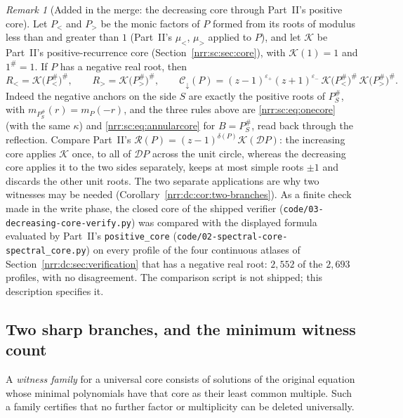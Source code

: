 \documentclass[11pt,letterpaper]{article}
\theoremstyle{definition}
\theoremstyle{remark}
\newtheorem{remark}[theorem]{Remark}
\newcommand{\scD}{\mathcal D}
\newcommand{\core}{\mathcal R}
\newcommand{\pcore}{\mathcal K}
\newcommand{\dcore}{\mathcal C_{\downarrow}}
\begin{document}
\begin{remark}[Added in the merge: the decreasing core through Part~II's positive core]
\label{nrr:dc:rem:reflected-core}
Let $P_<$ and $P_>$ be the monic factors of $P$ formed from its roots of
modulus less than and greater than $1$ (Part~II's $\mu_<$, $\mu_>$ applied to
$P$), and let $\pcore$ be Part~II's positive-recurrence core
(Section~\ref{nrr:sc:sec:core}), with $\pcore(1)=1$ and $1^\#=1$. If $P$ has
a negative real root, then
\[
 R_<=\pcore\bigl(P_<^\#\bigr)^\#,\qquad R_>=\pcore\bigl(P_>^\#\bigr)^\#,
 \qquad
 \dcore(P)=(z-1)^{\varepsilon_+}(z+1)^{\varepsilon_-}\,
 \pcore\bigl(P_<^\#\bigr)^\#\,\pcore\bigl(P_>^\#\bigr)^\#.
\]
Indeed the negative anchors on the side $S$ are exactly the positive roots of
$P_S^\#$, with $m_{P_S^\#}(r)=m_P(-r)$, and the three rules above are
\eqref{nrr:sc:eq:onecore} (with the same $\kappa$) and
\eqref{nrr:sc:eq:annularcore} for $B=P_S^\#$, read back through the
reflection. Compare Part~II's $\core(P)=(z-1)^{\delta(P)}\pcore(\scD P)$: the
increasing core applies $\pcore$ once, to all of $\scD P$ across the unit
circle, whereas the decreasing core applies it to the two sides separately,
keeps at most simple roots $\pm1$ and discards the other unit roots. The
two separate applications are why two witnesses may be needed
(Corollary~\ref{nrr:dc:cor:two-branches}). As a finite check made in the write
phase, the closed core of the shipped verifier
(\nolinkurl{code/03-decreasing-core-verify.py}) was compared with the displayed
formula evaluated by Part~II's \texttt{positive\_core}
(\nolinkurl{code/02-spectral-core-spectral_core.py}) on every profile of the
four continuous atlases of Section~\ref{nrr:dc:sec:verification} that has a
negative real root: $2{,}552$ of the $2{,}693$ profiles, with no disagreement.
The comparison script is not shipped; this description specifies it.
\end{remark}

\subsection{Two sharp branches, and the minimum witness count}

A \emph{witness family} for a universal core consists of solutions of
the original equation whose minimal polynomials have that core as their
least common multiple. Such a family certifies that no further factor
or multiplicity can be deleted universally.
\end{document}
